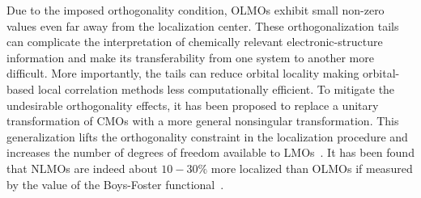 \documentclass[aps,prl,reprint,amsmath,amssymb]{revtex4-1}
\begin{document}
Due to the imposed orthogonality condition, OLMOs exhibit small non-zero values even far away from the localization center. 
These orthogonalization tails can complicate the interpretation of chemically relevant electronic-structure information and make its transferability from one system to another more difficult. More importantly, the tails can reduce orbital locality making orbital-based local correlation methods less computationally efficient.
%
% 
To mitigate the undesirable orthogonality effects, it has been proposed to replace a unitary transformation of CMOs with a more general nonsingular transformation. This generalization lifts the orthogonality constraint in the localization procedure and increases the number of degrees of freedom available to LMOs~\cite{anderson1968self, diner1968fully, magnasco1974localized, payne1977hartree, mehler1977self, feng2004An_efficient, cui2010efficient}. %
It has been found that NLMOs are indeed about $10-30 \%$ more localized than OLMOs if measured by the value of the Boys-Foster functional~\cite{feng2004An_efficient, liu2000nonorthogonal}. %
\end{document}
